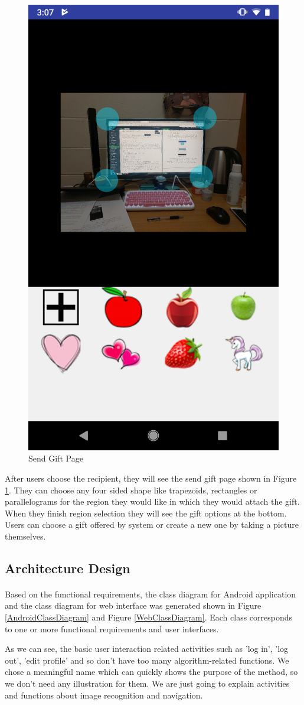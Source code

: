 \begin{figure}[H]
\centering
\includegraphics[width=.4\textwidth]{section03/assets/SendGift.png}
\caption[Send Gift Page]{\label{SendGiftUI}Send Gift Page}
\end{figure}
\par After users choose the recipient, they will see the send gift page shown in Figure \ref{SendGiftUI}. They can choose any four sided shape like trapezoids, rectangles or parallelograms for the region they would like in which they would attach the gift. When they finish region selection they will see the gift options at the bottom. Users can choose a gift offered by system or create a new one by taking a picture themselves. 

\subsection{Architecture Design}
\paragraph{}Based on the functional requirements, the class diagram for Android application and the class diagram for web interface was generated shown in Figure \ref{AndroidClassDiagram} and Figure \ref{WebClassDiagram}. Each class corresponds to one or more functional requirements and user interfaces.
\par As we can see, the basic user interaction related activities such as 'log in', 'log out', 'edit profile' and so don't have too many algorithm-related functions. We chose a meaningful name which can quickly shows the purpose of the method, so we don't need any illustration for them. We are just going to explain activities and functions about image recognition and navigation.

